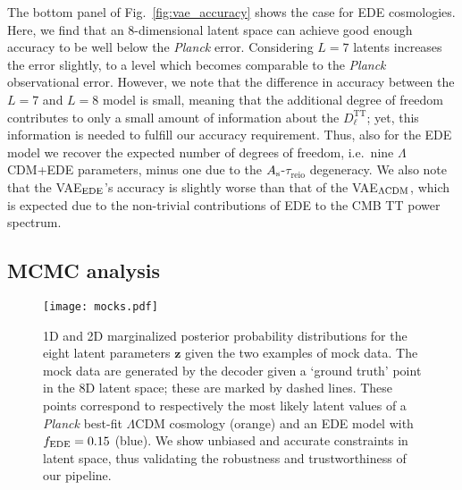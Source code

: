 \documentclass[aps, prd, reprint, superscriptaddress, nofootinbib, bibnotes]{revtex4-2}
\newcommand{\Planck}{\textit{Planck}}
\newcommand{\Dl}{$D_{\ell}^\mathrm{TT}$}
\begin{document}
The bottom panel of Fig.~\ref{fig:vae_accuracy} shows the case for EDE cosmologies. Here, we find that an 8-dimensional latent space can achieve good enough accuracy to be well below the \Planck{} error. 
Considering $L=7$ latents increases the error slightly, to a level which becomes comparable to the \Planck{} observational error. However, we note that the difference in accuracy between the $L=7$ and $L=8$ model is small, meaning that the additional degree of freedom contributes to only a small amount of information about the \Dl{}; yet, this information is needed to fulfill our accuracy requirement. Thus, also for the EDE model we recover the expected number of degrees of freedom, i.e.\ nine $\Lambda$CDM+EDE parameters, minus one due to the $A_{\rm{s}}$-$\tau_\mathrm{reio}$ degeneracy. We also note that the VAE$_{\rm EDE}$'s accuracy is slightly worse than that of the VAE$_{\Lambda\rm{CDM}}$, which is expected due to the non-trivial contributions of EDE to the CMB TT power spectrum.



\subsection{MCMC analysis}
\begin{figure}
\centering
\texttt{[image: mocks.pdf]}
\caption{1D and 2D marginalized posterior probability distributions for the eight latent parameters $\bm{z}$ given the two examples of mock data. The mock data are generated by the decoder given a `ground truth' point in the 8D latent space; these are marked by dashed lines. These points correspond to respectively the most likely latent values of a \Planck{} best-fit $\Lambda$CDM cosmology (orange) and an EDE model with $f_{\rm EDE}=0.15$ (blue). We show unbiased and accurate constraints in latent space, thus validating the robustness and trustworthiness of our pipeline.
}
\label{fig:mocktest}
\end{figure}

\begin{figure*}
    \centering
    \caption{1D and 2D marginalized posterior probability distributions for the latent parameters $\bm{z}$ given the \Planck{} data; the left panel shows the $\Lambda$CDM latent parameters in orange, and the right panel the EDE ones in blue. We compare the latent posterior constraints to theoretical expectations for the range of latent values allowed by a given set of cosmologies: a $\Lambda$CDM cosmology with best-fit parameters from Ref.~\cite{Planck:2018vyg} (green in both panels) and an EDE cosmology with best-fit parameters from \texttt{Plik\_lite} (pink in the right panel). Our constraints in latent space are thus consistent with previous constraints from the literature.
    }
    \label{fig:lcdmrefmodel_planck}
\end{figure*}
\end{document}
